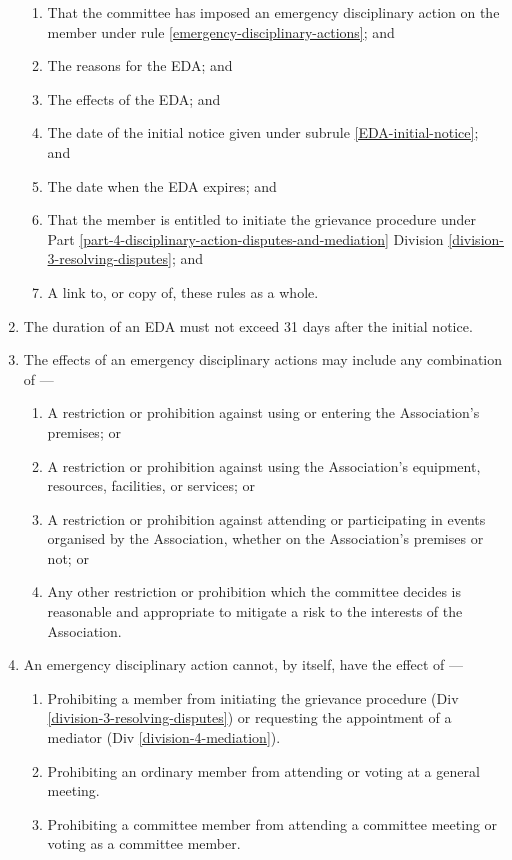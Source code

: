 \documentclass[../constitution.tex]{subfiles}
\begin{document}
\begin{enumerate}
        \begin{enumerate}
          \item That the committee has imposed an emergency disciplinary action on the member under rule \ref{emergency-disciplinary-actions}; and
          \item The reasons for the EDA; and
          \item The effects of the EDA; and
          \item The date of the initial notice given under subrule \ref{EDA-initial-notice}; and
          \item The date when the EDA expires; and
          \item That the member is entitled to initiate the grievance procedure under Part \ref{part-4-disciplinary-action-disputes-and-mediation} Division \ref{division-3-resolving-disputes}; and
          \item A link to, or copy of, these rules as a whole.
        \end{enumerate}

  \item The duration of an EDA must not exceed 31 days after the initial notice.

  \item The effects of an emergency disciplinary actions may include any combination of ---

        \begin{enumerate}
          \item A restriction or prohibition against using or entering the Association's premises; or
          \item A restriction or prohibition against using the Association's equipment, resources, facilities, or services; or
          \item A restriction or prohibition against attending or participating in events organised by the Association, whether on the Association's premises or not; or
          \item Any other restriction or prohibition which the committee decides is reasonable and appropriate to mitigate a risk to the interests of the Association.
        \end{enumerate}

  \item An emergency disciplinary action cannot, by itself, have the effect of ---

        \begin{enumerate}
          \item Prohibiting a member from initiating the grievance procedure (Div \ref{division-3-resolving-disputes}) or requesting the appointment of a mediator (Div \ref{division-4-mediation}).
          \item Prohibiting an ordinary member from attending or voting at a general meeting.
          \item Prohibiting a committee member from attending a committee meeting or voting as a committee member.
        \end{enumerate}


\end{enumerate}
\end{document}
